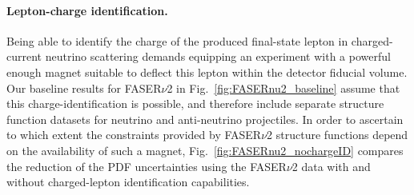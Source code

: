 
\paragraph{Lepton-charge identification.}
%
Being able to identify the charge of the produced final-state lepton in charged-current
neutrino scattering demands equipping an experiment with a powerful enough magnet suitable to
deflect this lepton within the detector fiducial volume.
%
Our baseline results for FASER$\nu$2 in Fig.~\ref{fig:FASERnu2_baseline} assume that this charge-identification
is possible, and therefore include separate structure function datasets for neutrino and anti-neutrino projectiles.
%
In order to ascertain to which extent the constraints provided by FASER$\nu$2 structure functions
depend on the availability of such a magnet,
Fig.~\ref{fig:FASERnu2_nochargeID} compares the reduction of the PDF uncertainties using
the FASER$\nu$2 data with and without charged-lepton identification capabilities.

